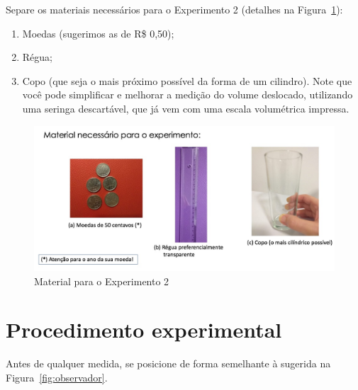 Separe os materiais necessários para o Experimento 2 (detalhes na Figura~\ref{fig:material}):

\begin{enumerate}
\item Moedas (sugerimos as de R\$ 0,50);
\item R\'egua;
\item Copo (que seja o mais pr\'oximo poss\'ivel da forma de um cilindro). Note que você pode simplificar e melhorar  a medição do volume deslocado, utilizando uma seringa descartável, que já vem  com uma escala volumétrica impressa.
\end{enumerate}


\begin{figure}[!hbt]
\centering
\includegraphics[height=0.28\paperheight]{Figuras_exp2/Foto1.jpg}
\caption{\label{fig:material} Material para o Experimento 2}
\end{figure}


\section{Procedimento experimental}
Antes de qualquer medida, se posicione de forma semelhante à sugerida na Figura~\ref{fig:observador}.

